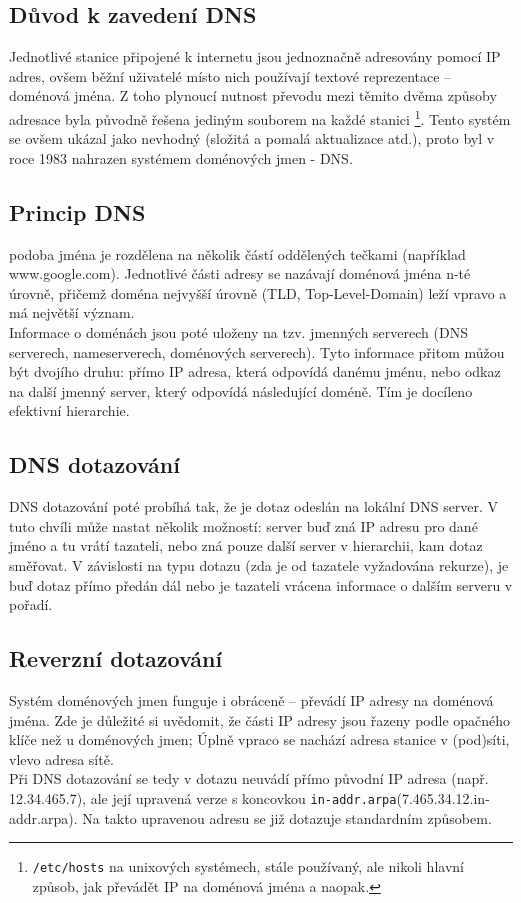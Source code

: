 \documentclass[a4paper, 11pt]{article}
\begin{document}
\subsection{Důvod k zavedení DNS}
Jednotlivé stanice připojené k internetu jsou jednoznačně adresovány pomocí IP adres, ovšem běžní uživatelé místo nich používají textové reprezentace – doménová jména. Z toho plynoucí nutnost převodu mezi těmito dvěma způsoby adresace byla původně řešena jediným souborem na každé stanici \footnote{\texttt{/etc/hosts} na unixových systémech, stále používaný, ale nikoli hlavní způsob, jak převádět IP na doménová jména a naopak.}. Tento systém se ovšem ukázal jako nevhodný (složitá a pomalá aktualizace atd.), proto byl v roce 1983 nahrazen systémem doménových jmen - DNS. \\
\subsection{Princip DNS}
 podoba jména je rozdělena na několik částí oddělených tečkami (například www.google.com). Jednotlivé části adresy se nazávají doménová jména n-té úrovně, přičemž doména nejvyšší úrovně (TLD, Top-Level-Domain) leží vpravo a má největší význam.\\
Informace o doménách jsou poté uloženy na tzv. jmenných serverech (DNS serverech, nameserverech, doménových serverech). Tyto informace přitom můžou být dvojího druhu: přímo IP adresa, která odpovídá danému jménu, nebo odkaz na další jmenný server, který odpovídá následující doméně. Tím je docíleno efektivní hierarchie.\\
\subsection{DNS dotazování}
DNS dotazování poté probíhá tak, že je dotaz odeslán na lokální DNS server. V tuto chvíli může nastat několik možností: server buď zná IP adresu pro dané jméno a tu vrátí tazateli, nebo zná pouze další server v hierarchii, kam dotaz směřovat. V závislosti na typu dotazu (zda je od tazatele vyžadována rekurze), je buď dotaz přímo předán dál nebo je tazateli vrácena informace o dalším serveru v pořadí.\\
\subsection{Reverzní dotazování}
Systém doménových jmen funguje i obráceně – převádí IP adresy na doménová jména. Zde je důležité si uvědomit, že části IP adresy jsou řazeny podle opačného klíče než u doménových jmen; Úplně vpraco se nachází adresa stanice v (pod)síti, vlevo adresa sítě.\\
Při DNS dotazování se tedy v dotazu neuvádí přímo původní IP adresa (např. 12.34.465.7), ale její upravená verze s koncovkou \texttt{in-addr.arpa}(7.465.34.12.in-addr.arpa). Na takto upravenou adresu se již dotazuje standardním způsobem. 
\end{document}
